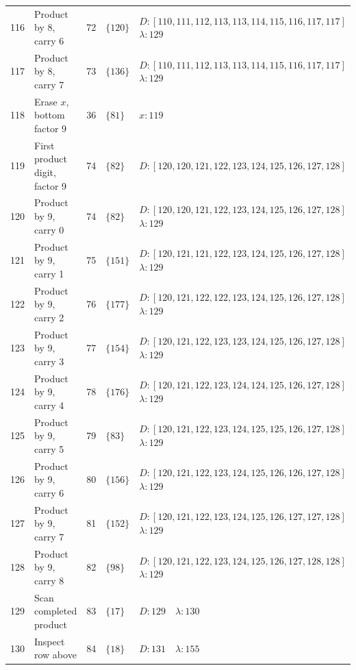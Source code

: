 \documentclass[11pt,a4paper]{article}
\newcommand{\blank}{\lambda}
\begin{document}
\begin{longtable}{r p{4.0cm} r l p{8.1cm}}
116 & Product by 8, carry 6 & 72 & $\{120\}$ & $D:[110,111,112,113,113,114,115,116,117,117]$\newline$\blank:129$ \\
117 & Product by 8, carry 7 & 73 & $\{136\}$ & $D:[110,111,112,113,113,114,115,116,117,117]$\newline$\blank:129$ \\
118 & Erase $x$, bottom factor 9 & 36 & $\{81\}$ & $x:119$ \\
119 & First product digit, factor 9 & 74 & $\{82\}$ & $D:[120,120,121,122,123,124,125,126,127,128]$ \\
120 & Product by 9, carry 0 & 74 & $\{82\}$ & $D:[120,120,121,122,123,124,125,126,127,128]$\newline$\blank:129$ \\
121 & Product by 9, carry 1 & 75 & $\{151\}$ & $D:[120,121,121,122,123,124,125,126,127,128]$\newline$\blank:129$ \\
122 & Product by 9, carry 2 & 76 & $\{177\}$ & $D:[120,121,122,122,123,124,125,126,127,128]$\newline$\blank:129$ \\
123 & Product by 9, carry 3 & 77 & $\{154\}$ & $D:[120,121,122,123,123,124,125,126,127,128]$\newline$\blank:129$ \\
124 & Product by 9, carry 4 & 78 & $\{176\}$ & $D:[120,121,122,123,124,124,125,126,127,128]$\newline$\blank:129$ \\
125 & Product by 9, carry 5 & 79 & $\{83\}$ & $D:[120,121,122,123,124,125,125,126,127,128]$\newline$\blank:129$ \\
126 & Product by 9, carry 6 & 80 & $\{156\}$ & $D:[120,121,122,123,124,125,126,126,127,128]$\newline$\blank:129$ \\
127 & Product by 9, carry 7 & 81 & $\{152\}$ & $D:[120,121,122,123,124,125,126,127,127,128]$\newline$\blank:129$ \\
128 & Product by 9, carry 8 & 82 & $\{98\}$ & $D:[120,121,122,123,124,125,126,127,128,128]$\newline$\blank:129$ \\
129 & Scan completed product & 83 & $\{17\}$ & $D:129\quad \blank:130$ \\
130 & Inspect row above & 84 & $\{18\}$ & $D:131\quad \blank:155$ \\

\end{longtable}
\end{document}
